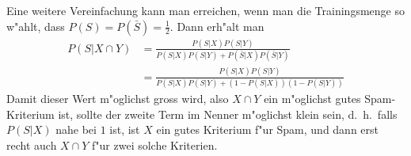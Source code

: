 Eine weitere Vereinfachung kann man erreichen, wenn man die Trainingsmenge so
w"ahlt, dass $P(S)=P(\bar S)=\frac12$.
Dann erh"alt man
\begin{align}
P(S|X\cap Y)
&=
\frac{P(S|X)P(S|Y)}{P(S|X)P(S|Y)+P(\bar S|X)P(\bar S|Y)}\nonumber
\\
&=
\frac{P(S|X)P(S|Y)}{P(S|X)P(S|Y)+(1-P(S|X))(1-P(S|Y))}
\end{align}
Damit dieser Wert m"oglichst gross wird, also $X\cap Y$ ein m"oglichst
gutes Spam-Kriterium ist, sollte der zweite Term im Nenner m"oglichst klein
sein, d.~h.~falls $P(S|X)$ nahe bei $1$ ist, ist $X$ ein gutes Kriterium f"ur
Spam, und dann erst recht auch $X\cap Y$ f"ur zwei solche Kriterien.
